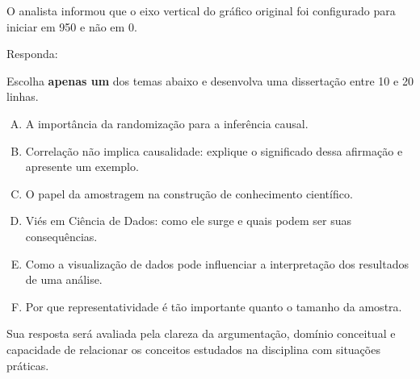 \documentclass[a4paper, 12pt, addpoints]{exam}
\begin{document}
\begin{questions}
	O analista informou que o eixo vertical do gráfico original foi configurado para iniciar em 950 e não em 0.
	
	Responda:
	
	
	
	\bonusquestion
	
	Escolha \textbf{apenas um} dos temas abaixo e desenvolva uma dissertação entre 10 e 20 linhas.
	
	\begin{enumerate}[A)]
		\item A importância da randomização para a inferência causal.
		
		\item Correlação não implica causalidade: explique o significado dessa afirmação e apresente um exemplo.
		
		\item O papel da amostragem na construção de conhecimento científico.
		
		\item Viés em Ciência de Dados: como ele surge e quais podem ser suas consequências.
		
		\item Como a visualização de dados pode influenciar a interpretação dos resultados de uma análise.
		
		\item Por que representatividade é tão importante quanto o tamanho da amostra.
	\end{enumerate}
	
	Sua resposta será avaliada pela clareza da argumentação, domínio conceitual e capacidade de relacionar os conceitos estudados na disciplina com situações práticas.	
\end{questions}
\end{document}
